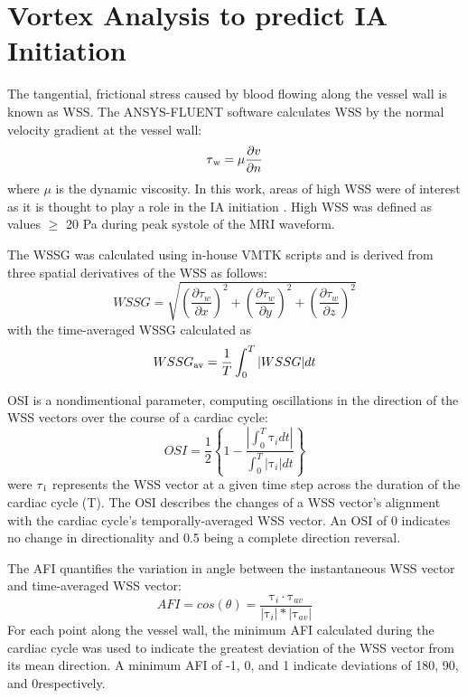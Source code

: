 \cleartooddpage[\thispagestyle{empty}]
\chapter{Vortex Analysis to predict IA Initiation}\label{CHAPTER4}
The tangential, frictional stress caused by blood flowing along the vessel wall is known as WSS. The ANSYS-FLUENT software calculates WSS by the normal velocity gradient at the vessel wall:
	\begin{equation}
\tau\textsubscript{w} = \mu\frac{\partial v}{\partial n}
	\end{equation}
where $\mu$ is the dynamic viscosity. In this work, areas of high WSS were of interest as it is thought to play a role in the IA initiation \cite{Meng1254}. High WSS was defined as values $\ge$ 20 Pa during peak systole of the MRI waveform.

The WSSG was calculated using in-house VMTK scripts and is derived from three spatial derivatives of the WSS as follows:
	\begin{equation}
WSSG = \sqrt{(\frac{\partial{\tau_{w}}}{\partial{x}})^2 + (\frac{\partial{\tau_{w}}}{\partial{y}})^2 + (\frac{\partial{\tau_{w}}}{\partial{z}})^2}
	\end{equation}
with the time-averaged WSSG calculated as
	\begin{equation}
WSSG\textsubscript{av} = \frac{1}{T}\int_{0}^{T} | WSSG | dt
	\end{equation}
	
OSI is a nondimentional parameter, computing oscillations in the direction of the WSS vectors over the course of a cardiac cycle:
	\begin{equation}
OSI=\frac{1}{2}\left\{1-\frac{| \int_{0}^{T} \mathrm{\tau}_{i}dt |}{\int_{0}^{T} | \mathrm{\tau}_{i} | dt}\right\}
	\end{equation}
were $\tau\textsubscript{i}$ represents the WSS vector at a given time step across the duration of the cardiac cycle (T). The OSI describes the changes of a WSS vector's alignment with the cardiac cycle's temporally-averaged WSS vector. An OSI of 0 indicates no change in directionality and 0.5 being a complete direction reversal. 

The AFI \cite{Mantha1113} quantifies the variation in angle between the instantaneous WSS vector and time-averaged WSS vector:
	\begin{equation}
AFI=cos(\theta)=\frac{\mathrm{\tau}_{i}\cdot \mathrm{\tau}_{av}}{| \mathrm{\tau}_{i} |*| \mathrm{\tau}_{av}|}
	\end{equation}
For each point along the vessel wall, the minimum AFI calculated during the cardiac cycle was used to indicate the greatest deviation of the WSS vector from its mean direction. A minimum AFI of -1, 0, and 1 indicate deviations of 180\textdegree, 90\textdegree, and 0\textdegree respectively.


